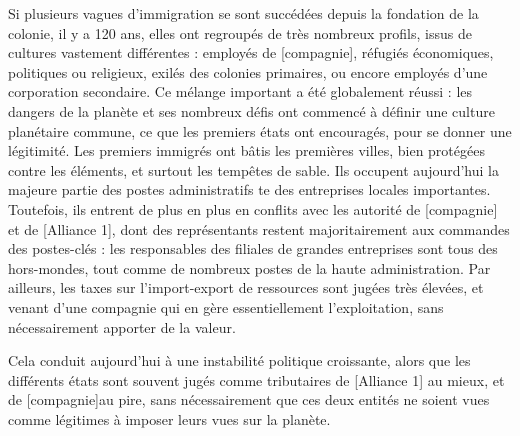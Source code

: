 \documentclass[10pt,a4paper]{book}
\begin{document}
\begin{multicols}{2}
Si plusieurs vagues d'immigration se sont succédées depuis la fondation de la colonie, il y a 120 ans, elles ont regroupés de très nombreux profils, issus de cultures vastement différentes : employés de [compagnie], réfugiés économiques, politiques ou religieux, exilés des colonies primaires, ou encore employés d'une corporation secondaire. Ce mélange important a été globalement réussi : les dangers de la planète et ses nombreux défis ont commencé à définir une culture planétaire commune, ce que les premiers états ont encouragés, pour se donner une légitimité.
Les premiers immigrés ont bâtis les premières villes, bien protégées contre les éléments, et surtout les tempêtes de sable. Ils occupent aujourd'hui la majeure partie des postes administratifs te des entreprises locales importantes. Toutefois, ils entrent de plus en plus en conflits avec les autorité de [compagnie] et de [Alliance 1], dont des représentants restent majoritairement aux commandes des postes-clés : les responsables des filiales de grandes entreprises sont tous des hors-mondes, tout comme de nombreux postes de la haute administration. Par ailleurs, les taxes sur l'import-export de ressources sont jugées très élevées, et venant d'une compagnie qui en gère essentiellement l'exploitation, sans nécessairement apporter de la valeur.

Cela conduit aujourd'hui à une instabilité politique croissante, alors que les différents états sont souvent jugés comme tributaires de [Alliance 1] au mieux, et de [compagnie]au pire, sans nécessairement que ces deux entités ne soient vues comme légitimes à imposer leurs vues sur la planète.
\end{multicols}
\end{document}
